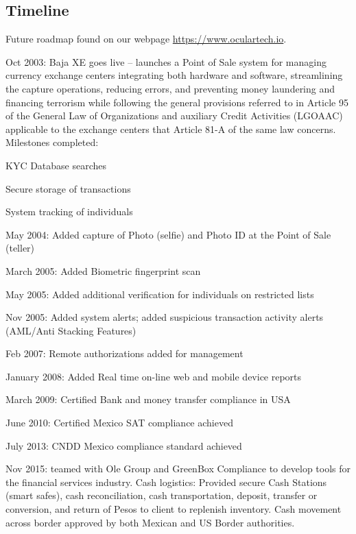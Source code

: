 \documentclass[12pt]{article}
\let\tempone\itemize
\let\temptwo\enditemize
\renewenvironment{itemize}{\tempone\addtolength{\itemsep}{-5pt}}{\temptwo}
\begin{document}
\subsection{Timeline}
Future roadmap found on our webpage \url{https://www.oculartech.io}.
\begin{itemize}
\item Oct 2003: Baja XE goes live – launches a Point of Sale system for managing currency exchange centers integrating both hardware and software, streamlining the capture operations, reducing errors, and preventing money laundering and financing terrorism while following the general provisions referred to in Article 95 of the General Law of Organizations and auxiliary Credit Activities (LGOAAC) applicable to the exchange centers that Article 81-A of the same law concerns.\newline
\\
Milestones completed:
\begin{itemize}
  \item KYC Database searches
  \item Secure storage of transactions
  \item System tracking of individuals
\end{itemize}
\item May 2004: Added capture of Photo (selfie) and Photo ID at the Point of Sale (teller)
\item March 2005: Added Biometric fingerprint scan
\item May 2005: Added additional verification for individuals on restricted lists
\item Nov 2005: Added system alerts; added suspicious transaction activity alerts (AML/Anti Stacking Features)
\item Feb 2007: Remote authorizations added for management
\item January 2008: Added Real time on-line web and mobile device reports
\item March 2009: Certified Bank and money transfer compliance in USA
\item June 2010: Certified Mexico SAT compliance achieved
\item July 2013: CNDD Mexico compliance standard achieved
\item Nov 2015: teamed with Ole Group and GreenBox Compliance to develop tools for the financial services industry. Cash logistics: Provided secure Cash Stations (smart safes), cash reconciliation, cash transportation, deposit, transfer or conversion, and return of Pesos to client to replenish inventory. Cash movement across border approved by both Mexican and US Border authorities.

\end{itemize}
\end{document}
